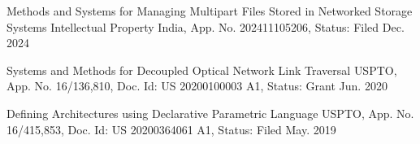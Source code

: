 
\begin{cventries}
  \pubentry
    {Methods and Systems for Managing Multipart Files Stored in Networked Storage Systems}
    {Intellectual Property India, App. No. 202411105206, Status: Filed}
    {Dec. 2024} %

  \pubentry
    {Systems and Methods for Decoupled Optical Network Link Traversal}
    {USPTO, App. No. 16/136,810, Doc. Id: US 20200100003 A1, Status: Grant}
    {Jun. 2020} %

  \pubentry
    {Defining Architectures using Declarative Parametric Language}
    {USPTO, App. No. 16/415,853, Doc. Id: US 20200364061 A1, Status: Filed}
    {May. 2019} %

\end{cventries}

